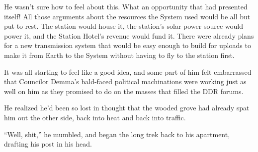 He wasn't sure how to feel about this. What an opportunity that had presented itself! All those arguments about the resources the System used would be all but put to rest. The station would house it, the station's solar power source would power it, and the Station Hotel's revenue would fund it. There were already plans for a new transmission system that would be easy enough to build for uploads to make it from Earth to the System without having to fly to the station first.

It was all starting to feel like a good idea, and some part of him felt embarrassed that Councilor Demma's bald-faced political machinations were working just as well on him as they promised to do on the masses that filled the DDR forums.

He realized he'd been so lost in thought that the wooded grove had already spat him out the other side, back into heat and back into traffic.

``Well, shit,'' he mumbled, and began the long trek back to his apartment, drafting his post in his head.

